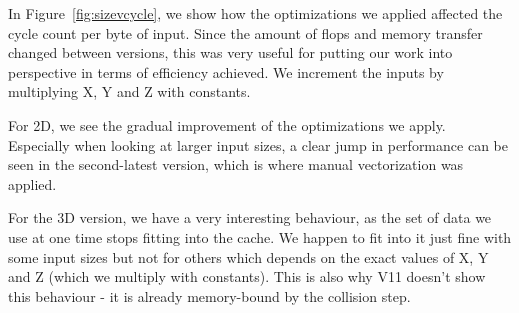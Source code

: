\documentclass[letterpaper]{article}
\begin{document}
In Figure~\ref{fig:sizevcycle}, we show how the optimizations we applied affected the cycle count per byte of input. Since the amount of flops and memory transfer changed between versions, this was very useful for putting our work into perspective in terms of efficiency achieved. We increment the inputs by multiplying X, Y and Z with constants.

For 2D, we see the gradual improvement of the optimizations we apply.
Especially when looking at larger input sizes, a clear jump in performance can be seen in the second-latest version, which is where manual vectorization was applied. 

For the 3D version, we have a very interesting behaviour, as the set of data we use at one time stops fitting into the cache. We happen to fit into it just fine with some input sizes but not for others which depends on the exact values of X, Y and Z (which we multiply with constants). This is also why V11 doesn't show this behaviour - it is already memory-bound by the collision step.
\end{document}
